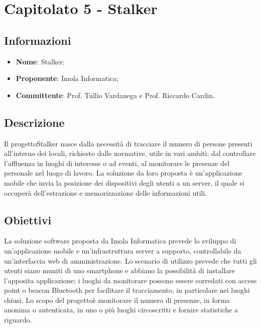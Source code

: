 \section{Capitolato 5 - Stalker}

\subsection{Informazioni}
\begin{itemize}
	\item \textbf{Nome}: Stalker;
	\item \textbf{Proponente}: Imola Informatica;
	\item \textbf{Committente}: Prof. Tullio Vardanega e Prof. Riccardo Cardin.
\end{itemize}

\subsection{Descrizione}
Il progetto\glosp Stalker nasce dalla necessità di tracciare il numero di persone presenti all'interno dei locali, richiesto dalle normative, utile in vari ambiti: dal controllare l'affluenza in luoghi di interesse o ad eventi, al monitorare le presenze del personale nel luogo di lavoro. La soluzione da loro proposta è un'applicazione mobile che invia la posizione dei dispositivi degli utenti a un server, il quale si occuperà dell'estrazione e memorizzazione delle informazioni utili.

\subsection{Obiettivi}
La soluzione software proposta da Imola Informatica prevede lo sviluppo di un'applicazione mobile e un'infrastruttura server a supporto, controllabile da un'interfaccia web di amministrazione. Lo scenario di utilizzo prevede che tutti gli utenti siano muniti di uno smartphone e abbiano la possibilità di installare l'apposita applicazione; i luoghi da monitorare possono essere corredati con access point o beacon Bluetooth per facilitare il tracciamento, in particolare nei luoghi chiusi. Lo scopo del progetto\glosp è monitorare il numero di presenze, in forma anonima o autenticata, in uno o più luoghi circoscritti e fornire statistiche a riguardo.

